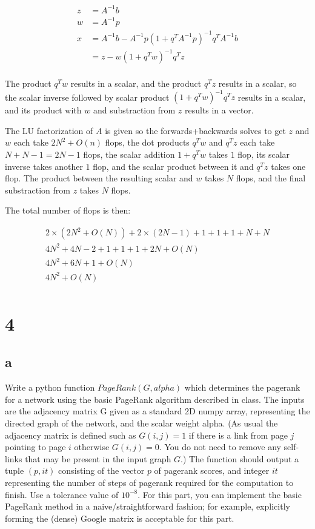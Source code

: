 \documentclass[11pt]{article}
\begin{document}
\begin{align*}
  z &= A^{-1} b \\
  w &= A^{-1} p \\
  x &= A^{-1} b - A^{-1} p (1 + q^T A^{-1} p)^{-1} q^{T} A^{-1} b \\
  &= z - w (1 + q^T w)^{-1} q^{T} z \\
\end{align*}

The product $q^T w$ results in a scalar, and the product $q^T z$ results in a scalar, so the scalar inverse followed by scalar product $(1 + q^T w)^{-1} q^{T} z$ results in a scalar, and its product with $w$ and substraction from $z$ results in a vector.

The LU factorization of $A$ is given so the forwards+backwards solves to get $z$ and $w$ each take $2N^2 + O(n)$ flops, the dot products $q^T w$ and $q^T z$ each take $N + N-1 = 2N-1$ flops, the scalar addition $1 + q^Tw$ takes $1$ flop, its scalar inverse takes another $1$ flop, and the scalar product between it and $q^T z$ takes one flop. The product between the resulting scalar and $w$ takes $N$ flops, and the final substraction from $z$ takes $N$ flops.

The total number of flops is then:

\begin{align*}
  2 \times (2N^2 + O(N)) + 2 \times (2N - 1) + 1 + 1 + 1 + N + N \\
  4N^2 + 4N - 2 + 1 + 1 + 1 + 2N + O(N) \\
  4N^2 + 6N + 1 + O(N) \\
  4N^2 + O(N) \\
\end{align*}

\section{4}

\subsection{a}

Write a python function $PageRank(G, alpha)$ which determines the pagerank for a network using the basic PageRank algorithm described in class. The inputs are the adjacency matrix G given as a standard 2D numpy array, representing the directed graph of the network, and the scalar weight alpha. (As usual the adjacency matrix is defined such as $G(i,j) = 1$ if there is a link from page $j$ pointing to page $i$ otherwise $G(i, j) = 0$. You do not need to remove any self-links that may be present in the input graph $G$.) The function should output a tuple $(p, it)$ consisting of the vector $p$ of pagerank scores, and integer $it$ representing the number of steps of pagerank required for the computation to finish. Use a tolerance value of $10^{-8}$. For this part, you can implement the basic PageRank method in a naive/straightforward fashion; for example, explicitly forming the (dense) Google matrix is acceptable for this part.
\end{document}
